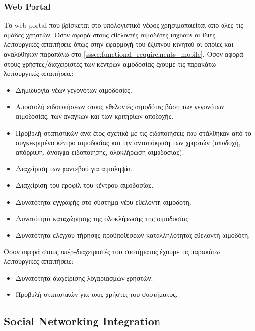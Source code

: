 			\subsubsection{Web Portal} \label{sssec:functional_requirements_web}
				Το web portal που βρίσκεται στο υπολογιστικό νέφος χρησιμοποιείται απο όλες τις ομάδες χρηστών. Όσον αφορά στους εθελοντές αιμοδότες ισχύουν οι ίδιες λειτουργικές απαιτήσεις όπως στην εφαρμογή του έξυπνου κινητού οι οποίες και αναλύθηκαν παραπάνω στο \ref{sssec:functional_requirements_mobile}. Όσον αφορά στους χρήστες/διαχειριστές των κέντρων αιμοδοσίας έχουμε τις παρακάτω λειτουργικές απαιτήσεις:
				\begin{itemize}
					\item Δημιουργία νέων γεγονότων αιμοδοσίας.
					\item Αποστολή ειδοποιήσεων στους εθελοντές αιμοδότες βάση των γεγονότων αιμοδοσίας, των αναγκών και των κριτηρίων αποδοχής.
					\item Προβολή στατιστικών ανά έτος σχετικά με τις ειδοποιήσεις που στάλθηκαν από το συγκεκριμένο κέντρο αιμοδοσίας και την ανταπόκριση των χρηστών (αποδοχή, απόρριψη, άνοιγμα ειδοποίησης, ολοκλήρωση αιμοδοσίας).
					\item Διαχείριση των ραντεβού για αιμοληψία.
					\item Διαχείριση του προφίλ του κέντρου αιμοδοσίας.
					\item Δυνατότητα εγγραφής στο σύστημα νέου εθελοντή αιμοδότη.
					\item Δυνατότητα καταχώρησης της ολοκλήρωσης της αιμοδοσίας.
					\item Δυνατότητα ελέγχου τήρησης προϋποθέσεων καταλληλότητας εθελοντή αιμοδότη.
				\end{itemize}
				Όσον αφορά στους υπέρ-διαχειριστές του συστήματος έχουμε τις παρακάτω λειτουργικές απαιτήσεις:
				\begin{itemize}
					\item Δυνατότητα διαχείρισης λογαριασμών χρηστών.
					\item Προβολή στατιστικών για τους χρήστες του συστήματος.
				\end{itemize}

	\subsection{Social Networking Integration}
